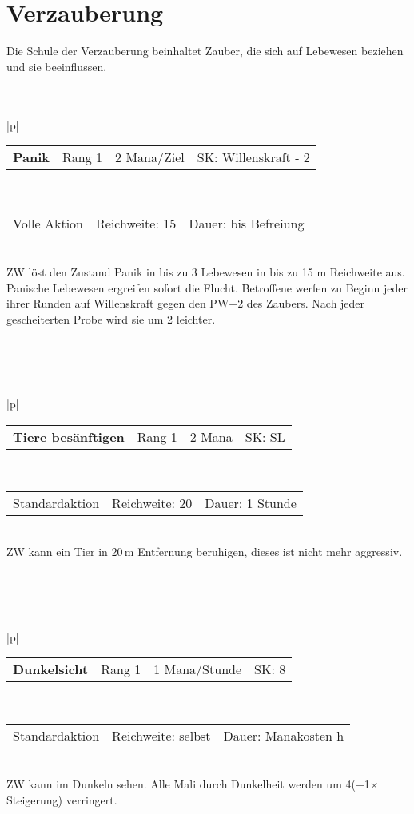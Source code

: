 \documentclass[../../Heldenanleitung2]{subfiles}
\begin{document}
\section{Verzauberung}
Die Schule der Verzauberung beinhaltet Zauber, die sich auf Lebewesen beziehen und sie beeinflussen.
\\\\\\
\begin{tabular}{|p{\textwidth}|}
\hline
\begin{tabularx}{\textwidth}{X|X|X|X}
\textbf{Panik} & Rang 1 & 2 Mana/Ziel & SK: Willenskraft - 2
\end{tabularx} \\ \hline
\begin{tabularx}{\textwidth}{X|X|X}
Volle Aktion & Reichweite: 15 & Dauer: bis Befreiung
\end{tabularx} \\ \hline
ZW löst den Zustand Panik in bis zu 3 Lebewesen in bis zu 15 m Reichweite aus. Panische Lebewesen ergreifen sofort die Flucht. Betroffene werfen zu Beginn jeder ihrer Runden auf Willenskraft gegen den PW+2 des Zaubers. Nach jeder gescheiterten Probe wird sie um 2 leichter.
\\ \hline
\end{tabular}
\\\\\\
\begin{tabular}{|p{\textwidth}|}
\hline
\begin{tabularx}{\textwidth}{X|X|X|X}
\textbf{Tiere besänftigen} & Rang 1 & 2 Mana & SK: SL
\end{tabularx} \\ \hline
\begin{tabularx}{\textwidth}{X|X|X}
Standardaktion & Reichweite: 20 & Dauer: 1 Stunde
\end{tabularx} \\ \hline
ZW kann ein Tier in 20\,m Entfernung beruhigen, dieses ist nicht mehr aggressiv.
\\ \hline
\end{tabular}
\\\\\\
\begin{tabular}{|p{\textwidth}|}
\hline
\begin{tabularx}{\textwidth}{X|X|X|X}
\textbf{Dunkelsicht} & Rang 1 & 1 Mana/Stunde & SK: 8
\end{tabularx} \\ \hline
\begin{tabularx}{\textwidth}{X|X|X}
Standardaktion & Reichweite: selbst & Dauer: Manakosten h
\end{tabularx} \\ \hline
ZW kann im Dunkeln sehen. Alle Mali durch Dunkelheit werden um 4(+1$\times$Steigerung) verringert.
\\ \hline
\end{tabular}
\end{document}
